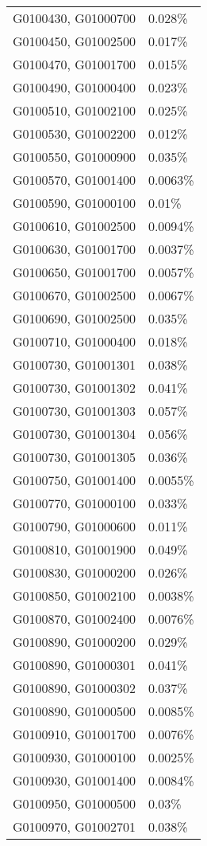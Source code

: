 \begin{longtable}[]{@{}ll@{}}
G0100430, G01000700 & 0.028\% \\
G0100450, G01002500 & 0.017\% \\
G0100470, G01001700 & 0.015\% \\
G0100490, G01000400 & 0.023\% \\
G0100510, G01002100 & 0.025\% \\
G0100530, G01002200 & 0.012\% \\
G0100550, G01000900 & 0.035\% \\
G0100570, G01001400 & 0.0063\% \\
G0100590, G01000100 & 0.01\% \\
G0100610, G01002500 & 0.0094\% \\
G0100630, G01001700 & 0.0037\% \\
G0100650, G01001700 & 0.0057\% \\
G0100670, G01002500 & 0.0067\% \\
G0100690, G01002500 & 0.035\% \\
G0100710, G01000400 & 0.018\% \\
G0100730, G01001301 & 0.038\% \\
G0100730, G01001302 & 0.041\% \\
G0100730, G01001303 & 0.057\% \\
G0100730, G01001304 & 0.056\% \\
G0100730, G01001305 & 0.036\% \\
G0100750, G01001400 & 0.0055\% \\
G0100770, G01000100 & 0.033\% \\
G0100790, G01000600 & 0.011\% \\
G0100810, G01001900 & 0.049\% \\
G0100830, G01000200 & 0.026\% \\
G0100850, G01002100 & 0.0038\% \\
G0100870, G01002400 & 0.0076\% \\
G0100890, G01000200 & 0.029\% \\
G0100890, G01000301 & 0.041\% \\
G0100890, G01000302 & 0.037\% \\
G0100890, G01000500 & 0.0085\% \\
G0100910, G01001700 & 0.0076\% \\
G0100930, G01000100 & 0.0025\% \\
G0100930, G01001400 & 0.0084\% \\
G0100950, G01000500 & 0.03\% \\
G0100970, G01002701 & 0.038\% \\

\end{longtable}
